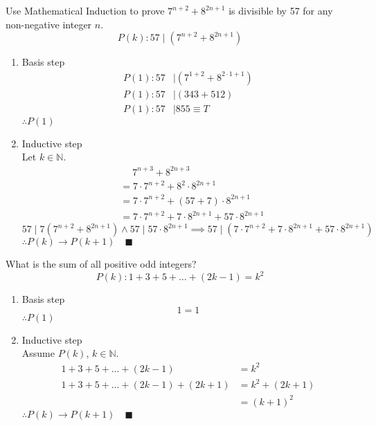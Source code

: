 \documentclass[letterpaper, 12pt]{article}
\newenvironment{proof}[1][Proof]{\begin{trivlist}
\item[\hskip \labelsep {\bfseries #1}]}{\end{trivlist}}
\newenvironment{example}[1][Example]{\begin{trivlist}
\item[\hskip \labelsep {\bfseries #1}]}{\end{trivlist}}
\newcommand{\qed}{\quad \blacksquare}
\newcommand{\then}{\rightarrow}
\newcommand{\N}{\mathbb{N}}
\newcommand{\0}{\emptyset}
\begin{document}
    \begin{example}
        Use Mathematical Induction to prove $7^{n + 2} + 8^{2n + 1}$ is divisible by 57 for 
        any non-negative integer $n$.
        \[P(k): 57 \mid (7^{n + 2} + 8^{2n + 1})\]
    \end{example}
    \begin{proof}
        \begin{enumerate}
            \item Basis step
            \begin{align*}
                P(1): 57 &\mid (7^{1 + 2} + 8^{2 \cdot 1 + 1}) \\
                P(1): 57 &\mid (343 + 512) \\
                P(1): 57 &\mid 855 \equiv T
            \end{align*}
            $\therefore P(1)$
            \item Inductive step \\
            Let $k \in \N$.
            \begin{align*}
                &\quad\; 7^{n + 3} + 8^{2n + 3} \\
                &= 7 \cdot 7^{n + 2} + 8^2 \cdot 8^{2n + 1} \\
                &= 7 \cdot 7^{n + 2} + (57 + 7) \cdot 8^{2n + 1} \\
                &= 7 \cdot 7^{n + 2} + 7 \cdot 8^{2n + 1} + 57 \cdot 8^{2n + 1}
            \end{align*}
            \[57 \mid 7(7^{n + 2} + 8^{2n + 1}) \wedge 57 \mid 57 \cdot 8^{2n + 1} 
            \implies 57 \mid (7 \cdot 7^{n + 2} + 7 \cdot 8^{2n + 1} + 57 \cdot 8^{2n + 1})\]
            $\therefore P(k) \then P(k + 1) \qed$
        \end{enumerate}
    \end{proof}
    \begin{example}
        What is the sum of all positive odd integers?
        \[P(k): 1 + 3 + 5 + \dots + (2k - 1) = k^2\]
    \end{example}
    \begin{proof}
        \begin{enumerate}
            \item Basis step
            \[1 = 1\]
            $\therefore P(1)$
            \item Inductive step \\
            Assume $P(k)$, $k \in \N$.
            \begin{align*}
                1 + 3 + 5 + \dots + (2k - 1) &= k^2 \\
                1 + 3 + 5 + \dots + (2k - 1) + (2k + 1) &= k^2 + (2k + 1) \\
                &= (k + 1)^2
            \end{align*}
            $\therefore P(k) \then P(k + 1) \qed$
        \end{enumerate}
    \end{proof}
\end{document}
